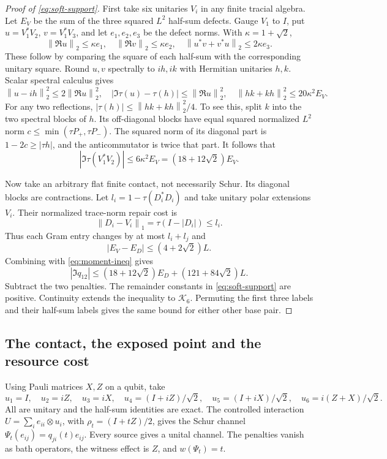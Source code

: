 \documentclass[11pt]{article}
\theoremstyle{definition}
\theoremstyle{remark}
\newcommand{\K}{\mathcal K}
\newcommand{\norm}[1]{\left\lVert#1\right\rVert}
\begin{document}
\begin{proof}[Proof of \eqref{eq:soft-support}]
First take six unitaries $V_i$ in any finite tracial algebra. Let $E_V$ be the sum of the three squared $L^2$ half-sum defects. Gauge $V_1$ to $I$, put $u=V_1^*V_2$, $v=V_1^*V_3$, and let $e_1,e_2,e_3$ be the defect norms. With $\kappa=1+\sqrt2$,
\[
 \norm{\Re u}_2\le\kappa e_1,\quad
 \norm{\Re v}_2\le\kappa e_2,\quad
 \norm{u^*v+v^*u}_2\le2\kappa e_3.
\]
These follow by comparing the square of each half-sum with the corresponding unitary square. Round $u,v$ spectrally to $ih,ik$ with Hermitian unitaries $h,k$. Scalar spectral calculus gives
\[
 \norm{u-ih}_2^2\le2\norm{\Re u}_2^2,
 \quad |\Im\tau(u)-\tau(h)|\le\norm{\Re u}_2^2,
 \quad \norm{hk+kh}_2^2\le20\kappa^2 E_V.
\]
For any two reflections, $|\tau(h)|\le\norm{hk+kh}_2^2/4$. To see this, split $k$ into the two spectral blocks of $h$. Its off-diagonal blocks have equal squared normalized $L^2$ norm $c\le\min(\tau P_+,\tau P_-)$. The squared norm of its diagonal part is $1-2c\ge|\tau h|$, and the anticommutator is twice that part. It follows that
\begin{equation}\label{eq:moment-ineq}
 |\Im\tau(V_1^*V_2)|\le6\kappa^2E_V=(18+12\sqrt2)E_V.
\end{equation}

Now take an arbitrary flat finite contact, not necessarily Schur. Its diagonal blocks are contractions. Let $l_i=1-\tau(D_i^*D_i)$ and take unitary polar extensions $V_i$. Their normalized trace-norm repair cost is
\[
 \norm{D_i-V_i}_1=\tau(I-|D_i|)\le l_i.
\]
Thus each Gram entry changes by at most $l_i+l_j$ and
\[
 |E_V-E_D|\le(4+2\sqrt2)L.
\]
Combining with \eqref{eq:moment-ineq} gives
\[
 |\Im q_{12}|\le(18+12\sqrt2)E_D+(121+84\sqrt2)L.
\]
Subtract the two penalties. The remainder constants in \eqref{eq:soft-support} are positive. Continuity extends the inequality to $\K_6$. Permuting the first three labels and their half-sum labels gives the same bound for either other base pair.
\end{proof}

\subsection{The contact, the exposed point and the resource cost}

Using Pauli matrices $X,Z$ on a qubit, take
\begin{equation}\label{eq:soft-unitaries}
 u_1=I,\quad u_2=iZ,\quad u_3=iX,\quad
 u_4=(I+iZ)/\sqrt2,\quad u_5=(I+iX)/\sqrt2,\quad
 u_6=i(Z+X)/\sqrt2.
\end{equation}
All are unitary and the half-sum identities are exact. The controlled interaction $U=\sum_i e_{ii}\otimes u_i$, with $\rho_t=(I+tZ)/2$, gives the Schur channel $\Psi_t(e_{ij})=q_{ji}(t)e_{ij}$. Every source gives a unital channel. The penalties vanish as bath operators, the witness effect is $Z$, and $w(\Psi_t)=t$.
\end{document}
